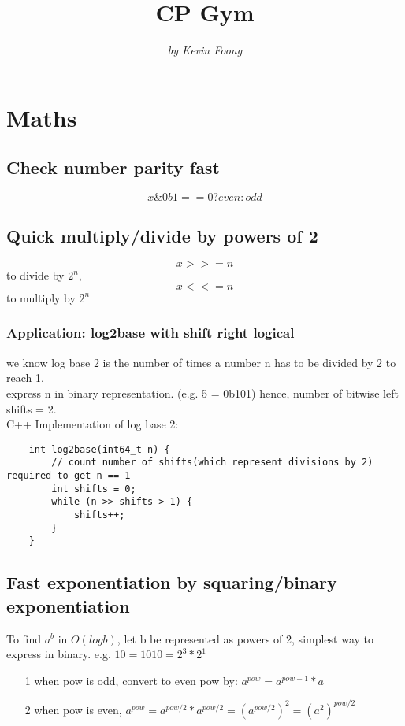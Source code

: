 \documentclass[12pt]{article}
\begin{document}
\title{\textbf{CP Gym}} 
\author{\textit{by Kevin Foong}} 
\date{}
\maketitle

\section{Maths} 

\subsection{Check number parity fast}
\[ x \& 0b1 == 0 ? even : odd\]

\subsection{Quick multiply/divide by powers of 2} 
\[ x >>= n\] to divide by \(2^n\), \[ x <<= n \] to multiply by \(2^n\)

\subsubsection{Application: log2base with shift right logical}
we know log base 2 is the number of times a number n has to be divided by 2 to reach 1. \\ 
express n in binary representation. (e.g. 5 = 0b101)
hence, number of bitwise left shifts = 2. \\ [\baselineskip] 

\noindent C++ Implementation of log base 2: 
\begin{verbatim}
	int log2base(int64_t n) {
		// count number of shifts(which represent divisions by 2) required to get n == 1
		int shifts = 0; 
		while (n >> shifts > 1) {
			shifts++; 
		}
	}  
\end{verbatim} 

\subsection{Fast exponentiation by squaring/binary exponentiation}

To find \(a^b\) in \(O(logb)\),  let b be represented as powers of 2, simplest way to express in binary. 
e.g. \(10 = 1010 = 2^3 * 2^1\)

\begin{itemize}
	\item[1] when pow is odd, convert to even pow by: \(a^{pow} = a^{pow - 1} * a\)
	\item[2] when pow is even, \(a^{pow} = a^{pow / 2} * a^{pow / 2} = (a^{pow / 2})^2 = (a^2)^{pow / 2}\)
\end{itemize} 
\end{document}
